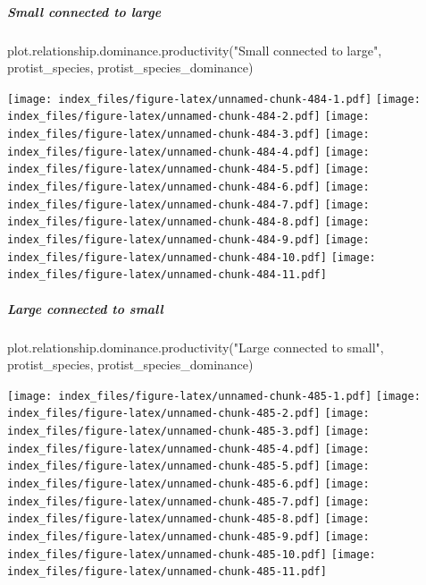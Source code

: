 \documentclass[
]{article}
\newenvironment{Shaded}{\begin{snugshade}}{\end{snugshade}}
\newcommand{\FunctionTok}[1]{\textcolor[rgb]{0.00,0.00,0.00}{#1}}
\newcommand{\NormalTok}[1]{#1}
\newcommand{\StringTok}[1]{\textcolor[rgb]{0.31,0.60,0.02}{#1}}
\begin{document}
\hypertarget{small-connected-to-large-3}{%
\subparagraph{Small connected to
large}\label{small-connected-to-large-3}}

\begin{Shaded}
\begin{Highlighting}[]
\FunctionTok{plot.relationship.dominance.productivity}\NormalTok{(}\StringTok{"Small connected to large"}\NormalTok{,}
\NormalTok{                                         protist\_species,}
\NormalTok{                                         protist\_species\_dominance)}
\end{Highlighting}
\end{Shaded}

\texttt{[image: index\_files/figure-latex/unnamed-chunk-484-1.pdf]}
\texttt{[image: index\_files/figure-latex/unnamed-chunk-484-2.pdf]}
\texttt{[image: index\_files/figure-latex/unnamed-chunk-484-3.pdf]}
\texttt{[image: index\_files/figure-latex/unnamed-chunk-484-4.pdf]}
\texttt{[image: index\_files/figure-latex/unnamed-chunk-484-5.pdf]}
\texttt{[image: index\_files/figure-latex/unnamed-chunk-484-6.pdf]}
\texttt{[image: index\_files/figure-latex/unnamed-chunk-484-7.pdf]}
\texttt{[image: index\_files/figure-latex/unnamed-chunk-484-8.pdf]}
\texttt{[image: index\_files/figure-latex/unnamed-chunk-484-9.pdf]}
\texttt{[image: index\_files/figure-latex/unnamed-chunk-484-10.pdf]}
\texttt{[image: index\_files/figure-latex/unnamed-chunk-484-11.pdf]}

\hypertarget{large-connected-to-small}{%
\subparagraph{Large connected to small}\label{large-connected-to-small}}

\begin{Shaded}
\begin{Highlighting}[]
\FunctionTok{plot.relationship.dominance.productivity}\NormalTok{(}\StringTok{"Large connected to small"}\NormalTok{,}
\NormalTok{                                         protist\_species,}
\NormalTok{                                         protist\_species\_dominance)}
\end{Highlighting}
\end{Shaded}

\texttt{[image: index\_files/figure-latex/unnamed-chunk-485-1.pdf]}
\texttt{[image: index\_files/figure-latex/unnamed-chunk-485-2.pdf]}
\texttt{[image: index\_files/figure-latex/unnamed-chunk-485-3.pdf]}
\texttt{[image: index\_files/figure-latex/unnamed-chunk-485-4.pdf]}
\texttt{[image: index\_files/figure-latex/unnamed-chunk-485-5.pdf]}
\texttt{[image: index\_files/figure-latex/unnamed-chunk-485-6.pdf]}
\texttt{[image: index\_files/figure-latex/unnamed-chunk-485-7.pdf]}
\texttt{[image: index\_files/figure-latex/unnamed-chunk-485-8.pdf]}
\texttt{[image: index\_files/figure-latex/unnamed-chunk-485-9.pdf]}
\texttt{[image: index\_files/figure-latex/unnamed-chunk-485-10.pdf]}
\texttt{[image: index\_files/figure-latex/unnamed-chunk-485-11.pdf]}
\end{document}
